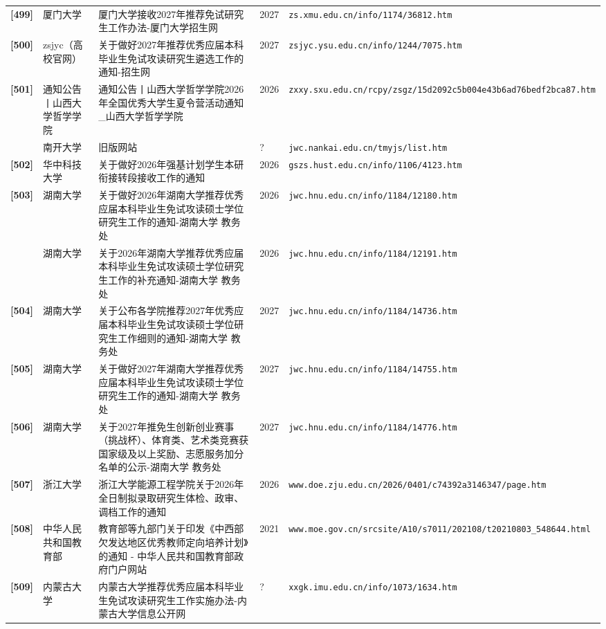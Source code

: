 {\begin{longtable}{@{}p{1.15cm}p{2.9cm}p{6.3cm}p{0.85cm}p{5.0cm}@{}}
\textbf{[499]} & 厦门大学 & 厦门大学接收2027年推荐免试研究生工作办法-厦门大学招生网 & 2027 & \texttt{zs.xmu.edu.cn/info/1174/36812.htm} \\
\textbf{[500]} & zsjyc（高校官网） & 关于做好2027年推荐优秀应届本科毕业生免试攻读研究生遴选工作的通知-招生网 & 2027 & \texttt{zsjyc.ysu.edu.cn/info/1244/7075.htm} \\
\textbf{[501]} & 通知公告丨山西大学哲学学院 & 通知公告丨山西大学哲学学院2026年全国优秀大学生夏令营活动通知\_山西大学哲学学院 & 2026 & \texttt{zxxy.sxu.edu.cn/rcpy/zsgz/15d2092c5b004e43b6ad76bedf2bca87.htm} \\
[0] & 南开大学 & \textbar{} 旧版网站 & ? & \texttt{jwc.nankai.edu.cn/tmyjs/list.htm} \\
\textbf{[502]} & 华中科技大学 & 关于做好2026年强基计划学生本研衔接转段接收工作的通知 & 2026 & \texttt{gszs.hust.edu.cn/info/1106/4123.htm} \\
\textbf{[503]} & 湖南大学 & 关于做好2026年湖南大学推荐优秀应届本科毕业生免试攻读硕士学位研究生工作的通知-湖南大学 教务处 & 2026 & \texttt{jwc.hnu.edu.cn/info/1184/12180.htm} \\
[0] & 湖南大学 & 关于2026年湖南大学推荐优秀应届本科毕业生免试攻读硕士学位研究生工作的补充通知-湖南大学 教务处 & 2026 & \texttt{jwc.hnu.edu.cn/info/1184/12191.htm} \\
\textbf{[504]} & 湖南大学 & 关于公布各学院推荐2027年优秀应届本科毕业生免试攻读硕士学位研究生工作细则的通知-湖南大学 教务处 & 2027 & \texttt{jwc.hnu.edu.cn/info/1184/14736.htm} \\
\textbf{[505]} & 湖南大学 & 关于做好2027年湖南大学推荐优秀应届本科毕业生免试攻读硕士学位研究生工作的通知-湖南大学 教务处 & 2027 & \texttt{jwc.hnu.edu.cn/info/1184/14755.htm} \\
\textbf{[506]} & 湖南大学 & 关于2027年推免生创新创业赛事（挑战杯）、体育类、艺术类竞赛获国家级及以上奖励、志愿服务加分名单的公示-湖南大学 教务处 & 2027 & \texttt{jwc.hnu.edu.cn/info/1184/14776.htm} \\
\textbf{[507]} & 浙江大学 & 浙江大学能源工程学院关于2026年全日制拟录取研究生体检、政审、调档工作的通知 & 2026 & \texttt{www.doe.zju.edu.cn/2026/0401/c74392a3146347/page.htm} \\
\textbf{[508]} & 中华人民共和国教育部 & 教育部等九部门关于印发《中西部欠发达地区优秀教师定向培养计划》的通知 - 中华人民共和国教育部政府门户网站 & 2021 & \texttt{www.moe.gov.cn/srcsite/A10/s7011/202108/t20210803\_548644.html} \\
\textbf{[509]} & 内蒙古大学 & 内蒙古大学推荐优秀应届本科毕业生免试攻读研究生工作实施办法-内蒙古大学信息公开网 & ? & \texttt{xxgk.imu.edu.cn/info/1073/1634.htm} \\

\end{longtable}}
